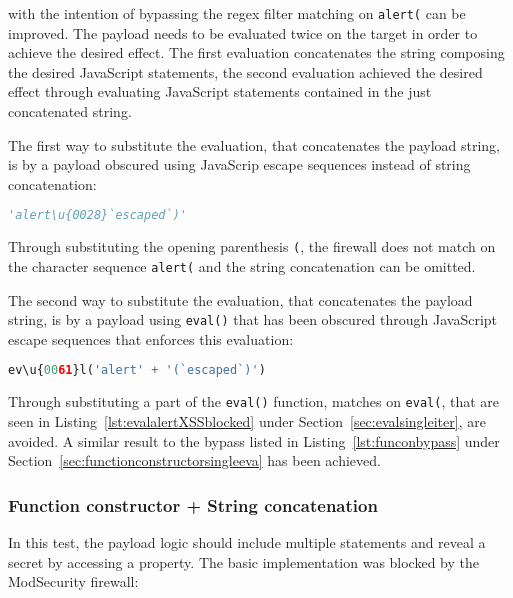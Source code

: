 with the intention of bypassing the regex filter matching on \verb|alert(| can be improved. The payload needs to be evaluated twice on the target in order to achieve the desired effect. The first evaluation concatenates the string composing the desired JavaScript statements, the second evaluation achieved the desired effect through evaluating JavaScript statements contained in the just concatenated string. 

The first way to substitute the evaluation, that concatenates the payload string, is by a payload obscured using JavaScrip escape sequences instead of string concatenation:

\begin{lstlisting}[style=basicStyle, language=Python, caption='alert\textbackslash u\{0028\}`escaped`) bypass]
'alert\u{0028}`escaped`)'
\end{lstlisting}

Through substituting the opening parenthesis \verb|(|, the firewall does not match on the character sequence \verb|alert(| and the string concatenation can be omitted.

The second way to substitute the evaluation, that concatenates the payload string, is by a payload using \verb|eval()| that has been obscured through JavaScript escape sequences that enforces this evaluation:

\begin{lstlisting}[style=basicStyle, language=Python, caption='ev\textbackslash u\{0061\}l('alert' + '(`escaped`)') bypass]
ev\u{0061}l('alert' + '(`escaped`)')
\end{lstlisting}

Through substituting a part of the \verb|eval()| function, matches on \verb|eval(|, that are seen in Listing~\ref{lst:evalalertXSSblocked} under Section~\ref{sec:evalsingleiter}, are avoided. A similar result to the bypass listed in Listing~\ref{lst:funconbypass} under Section~\ref{sec:functionconstructorsingleeva} has been achieved.



\subsubsection{Function constructor + String concatenation}
\label{sec:funconstrconbypass}
In this test, the payload logic should include multiple statements and reveal a secret by accessing a property.
The basic implementation was blocked by the ModSecurity firewall:

